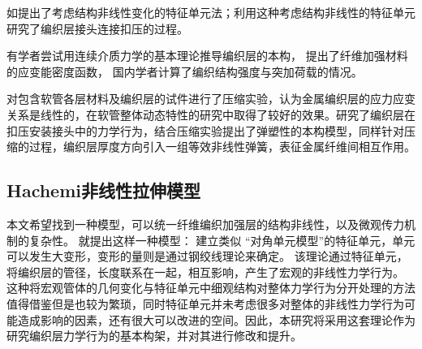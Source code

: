 如\citeauthor{Reese2003}\cite{Reese2003}提出了考虑结构非线性变化的特征单元法；\citeauthor{Rattensperger2003}\cite{Rattensperger2003}利用这种考虑结构非线性的特征单元研究了编织层接头连接扣压的过程。

有学者尝试用连续介质力学的基本理论推导编织层的本构，\citeauthor{Horgan2005}\cite{Horgan2005} 提出了纤维加强材料的应变能密度函数，
国内学者计算了编织结构强度与突加荷载的情况\cite{renjiusheng2009}。

\citeauthor{Wijaya2012}\cite{Wijaya2012}对包含软管各层材料及编织层的试件进行了压缩实验，认为金属编织层的应力应变关系是线性的，在软管整体动态特性的研究中取得了较好的效果。\citeauthor{Cho2005}\cite{Cho2005}研究了编织层在扣压安装接头中的力学行为，结合压缩实验提出了弹塑性的本构模型，\citeauthor{Rattensperger2003}\cite{Rattensperger2003}同样针对压缩的过程，编织层厚度方向引入一组等效非线性弹簧，表征金属纤维间相互作用。
\cite{peirce19375,menges1976spannungs,kato1999formulation,schock1989some,hino1994evaluation}

\subsection{Hachemi非线性拉伸模型}

本文希望找到一种模型，可以统一纤维编织加强层的结构非线性，以及微观传力机制的复杂性。
\citeauthor{Hachemi2011}\cite{Hachemi2011}就提出这样一种模型：
建立类似
 \citeauthor{ma_elastic_1986} “对角单元模型”\cite{ma_elastic_1986}的特征单元，单元可以发生大变形，变形的量则是通过钢绞线理论来确定。
 该理论通过特征单元，将编织层的管径，长度联系在一起，相互影响，产生了宏观的非线性力学行为。
 这种将宏观管体的几何变化与特征单元中细观结构对整体力学行为分开处理的方法值得借鉴但是也较为繁琐，同时\ha 特征单元并未考虑很多对整体的非线性力学行为可能造成影响的因素，还有很大可以改进的空间。因此，本研究将采用这套理论作为研究编织层力学行为的基本构架，并对其进行修改和提升。
 

